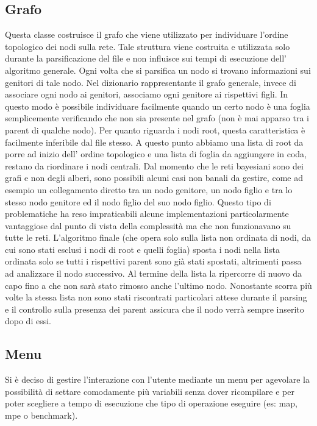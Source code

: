 \subsection{Grafo}
Questa classe costruisce il grafo che viene utilizzato per individuare l’ordine topologico dei nodi sulla rete. Tale struttura viene costruita e utilizzata solo durante la parsificazione del file e non influisce sui tempi di esecuzione dell’ algoritmo generale.
Ogni volta che si parsifica un nodo si trovano informazioni sui genitori di tale nodo. Nel dizionario rappresentante il grafo generale, invece di associare ogni nodo ai genitori, associamo ogni genitore ai rispettivi figli. In questo modo è possibile individuare facilmente quando un certo nodo è una foglia semplicemente verificando che non sia presente nel grafo (non è mai apparso tra i parent di qualche nodo). Per quanto riguarda i nodi root, questa caratteristica è facilmente inferibile dal file stesso. A questo punto abbiamo una lista di root da porre ad inizio dell’ ordine topologico e una lista di foglia da aggiungere in coda, restano da riordinare i nodi centrali. Dal momento che le reti bayesiani sono dei grafi e non degli alberi, sono possibili alcuni casi non banali da gestire, come ad esempio un collegamento diretto tra un nodo genitore, un nodo figlio e tra lo stesso nodo genitore ed il nodo figlio del suo nodo figlio. Questo tipo di problematiche ha reso impraticabili alcune implementazioni particolarmente vantaggiose dal punto di vista della complessità ma che non funzionavano su tutte le reti. L’algoritmo finale (che opera solo sulla lista non ordinata di nodi, da cui sono stati esclusi i nodi di root e quelli foglia) sposta i nodi nella lista ordinata solo se tutti i rispettivi parent sono già stati spostati, altrimenti passa ad analizzare il nodo successivo. Al termine della lista la ripercorre di nuovo da capo fino a che non sarà stato rimosso anche l’ultimo nodo. Nonostante scorra più volte la stessa lista non sono stati riscontrati particolari attese durante il parsing e il controllo sulla presenza dei parent assicura che il nodo verrà sempre inserito dopo di essi.

\subsection{Menu}
Si è deciso di gestire l’interazione con l’utente mediante un menu per agevolare la possibilità di settare comodamente più variabili senza dover ricompilare e per poter scegliere a tempo di esecuzione che tipo di operazione eseguire (es: map, mpe o benchmark).


